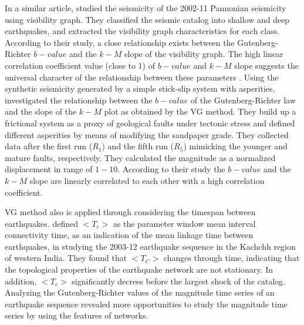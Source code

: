 In a similar article, \citet{Telesca2014} studied the seismicity of the 2002-11 Pannonian seismicity using visibility graph. They classified the seismic catalog into shallow and deep earthquakes, and extracted the visibility graph characteristics for each class. According to their study, a close relationship exists between the Gutenberg-Richter $b-value$ and the $k-M$ slope of the visibility graph. The high linear correlation coefficient value (close to 1) of $b-value$ and $k-M$  slope suggests the universal character of the relationship between these parameters \citep{Telesca2014}.  Using the synthetic seismicity generated by a simple stick-slip system with asperities, \citet{Telesca2014-pone} investigated the relationship between the $b-value$ of the Gutenberg-Richter law and the slope of the $k-M$ plot as obtained by the VG method. They build up a frictional system as a proxy of geological faults under tectonic stress and defined different asperities by means of modifying the sandpaper grade. They collected data after the first run ($R_1$) and the fifth run ($R_5$) mimicking the younger and mature faults, respectively. They calculated the magnitude as a normalized displacement in range of $1-10$. According to their study the $b-value$ and the $k-M$ slope are linearly correlated to each other with a high correlation coefficient.

VG method also is applied through considering the timespan between earthquakes. \citet{Telesca2016} defined $<T_c>$ as the parameter window mean interval connectivity time, as an indication of the mean linkage time between earthquakes, in studying the 2003-12 earthquake sequence in the Kachchh region of western India. They found that $<T_C>$ changes through time, indicating that the topological properties of the earthquake network are not stationary. In addition, $<T_c>$ significantly decrees before the largest shock of the catalog. Analyzing the Gutenberg-Richter values of  the magnitude time series of an earthquake sequence revealed more opportunities to study the magnitude time series by using the features of networks. 

